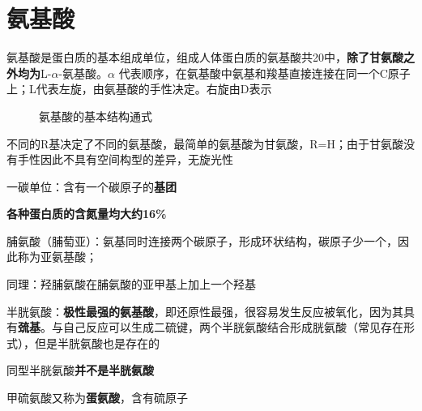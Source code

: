 {}
\section*{氨基酸}%
\label{sec*:氨基酸}
氨基酸是蛋白质的基本组成单位，组成人体蛋白质的氨基酸共20中，\textbf{除了甘氨酸之外均为}L-$\alpha$-氨基酸。$\alpha$ 代表顺序，在氨基酸中氨基和羧基直接连接在同一个C原子上；L代表左旋，由氨基酸的手性决定。右旋由D表示

\begin{figure}[ht!]
    \centering
    \caption{氨基酸的基本结构通式}
    \label{fig:氨基酸的基本结构通式}
\end{figure}
不同的R基决定了不同的氨基酸，最简单的氨基酸为甘氨酸，R=H；由于甘氨酸没有手性因此不具有空间构型的差异，无旋光性
\begin{notation}
    一碳单位：含有一个碳原子的\textbf{基团}
\end{notation}
\textbf{各种蛋白质的含氮量均大约16\%}
\begin{eg}
    脯氨酸（脯萄亚）：氨基同时连接两个碳原子，形成环状结构，碳原子少一个，因此称为亚氨基酸；

    同理：羟脯氨酸在脯氨酸的亚甲基上加上一个羟基
\end{eg}
\begin{eg}
    半胱氨酸：\textbf{极性最强的氨基酸}，即还原性最强，很容易发生反应被氧化，因为其具有\textbf{巯基}。与自己反应可以生成二硫键，两个半胱氨酸结合形成胱氨酸（常见存在形式），但是半胱氨酸也是存在的
\end{eg}
\begin{notation}
    同型半胱氨酸\textbf{并不是半胱氨酸}
\end{notation}
\begin{notation}
    甲硫氨酸又称为\textbf{蛋氨酸}，含有硫原子
\end{notation}
